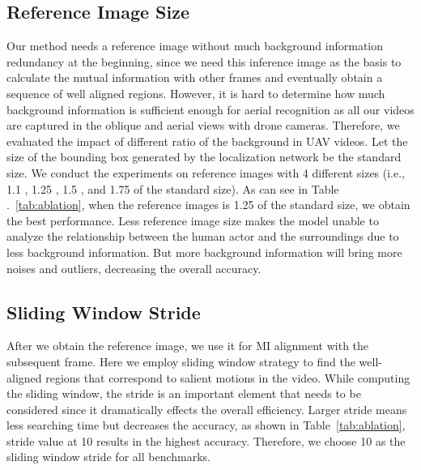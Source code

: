 \documentclass[10pt,twocolumn,letterpaper]{article}
\begin{document}
{\subsection{Reference Image Size}
Our method needs a reference image without much background information redundancy at the beginning, since we need this inference image as the basis to calculate the mutual information with other frames and eventually obtain a sequence of well aligned regions. However, it is hard to determine how much background information is sufficient enough for aerial recognition as all our videos are captured in the oblique and aerial views with drone cameras. Therefore, we evaluated the impact of different ratio of the background in UAV videos. Let the size of the bounding box generated by the localization network be the standard size. We conduct the experiments on reference images with 4 different sizes (i.e., 1.1 , 1.25 , 1.5 , and 1.75  of the standard size). As can see in Table .~\ref{tab:ablation}, when the reference images is 1.25 of the standard size, we obtain the best performance. Less reference image size makes the model unable to analyze the relationship between the human actor and the surroundings due to less background information. But more background information will bring more noises and outliers, decreasing the overall accuracy.



\subsection{Sliding Window Stride}
After we obtain the reference image, we use it for MI alignment with the subsequent frame. Here we employ sliding window strategy to find the well-aligned regions that correspond to salient motions in the video. While computing the sliding window, the stride is an important element that needs to be considered since it dramatically effects the overall efficiency. Larger stride means less searching time but decreases the accuracy, as shown in Table~\ref{tab:ablation}, stride value at 10 results in the highest accuracy. Therefore, we choose 10 as the sliding window stride for all benchmarks.


}
\end{document}
